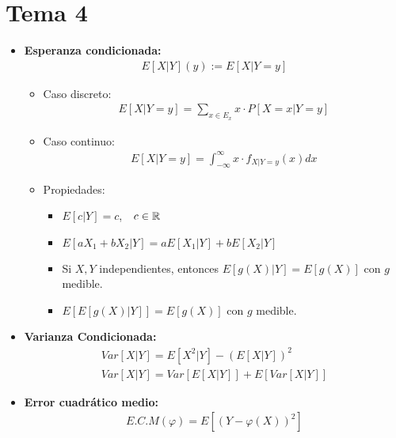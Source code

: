 \documentclass[12pt]{article}
\begin{document}
\portada[%
    titulo=Probabilidad,
    subtitulo=Resumen,
    autor=Jesús Muñoz Velasco,
    año=Curso 2024-2025]

    \section{Tema 4}

    \begin{itemize}
        \item \textbf{Esperanza condicionada:}
        \begin{gather*}
            E[X|Y](y):=E[X|Y=y]
        \end{gather*}
        \begin{itemize}
            \item Caso discreto:
            \begin{align*}
                E[X|Y=y] = \sum\limits_{x\in E_x} x \cdot P[X=x|Y=y]
            \end{align*}
            \item Caso continuo:
            \begin{align*}
                E[X|Y=y] = \int_{-\infty}^{\infty} x \cdot f_{X|Y=y}(x) dx
            \end{align*}
            \item Propiedades:
            \begin{itemize}
                \item $E[c|Y]=c$,\ \ $c\in \mathbb{R}$
                \item $E[aX_1 + bX_2|Y]=aE[X_1|Y]+ bE[X_2|Y]$
                \item Si $X,Y$ independientes, entonces $E[g(X)|Y]=E[g(X)]$ con $g$ medible.
                \item $E[E[g(X)|Y]]=E[g(X)]$ con $g$ medible.
            \end{itemize}
        \end{itemize}

        \item \textbf{Varianza Condicionada:}
        \begin{gather*}
            Var[X|Y]=E[X^2|Y]-(E[X|Y])^2\\
            Var[X|Y]=Var[E[X|Y]] + E[Var[X|Y]]
        \end{gather*}

        \item \textbf{Error cuadrático medio:}
        \begin{gather*}
            E.C.M(\varphi) = E[(Y-\varphi(X))^2]
        \end{gather*}


\end{itemize}
\end{document}
